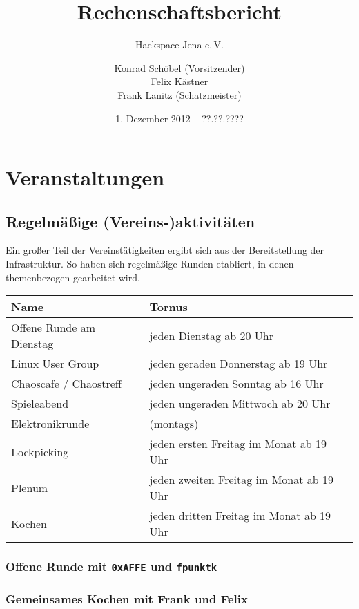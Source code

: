 \documentclass[10pt,DIV16]{scrartcl}
\title{Rechenschaftsbericht}
\subtitle{Hackspace Jena e.\,V.}
\author{%
	Konrad Schöbel (Vorsitzender)\\
	Felix Kästner\\
	Frank Lanitz (Schatzmeister)
}
\date{1. Dezember 2012 -- ??.??.????}
\begin{document}
\maketitle{}

\tableofcontents{}

\newpage{}

\section{Veranstaltungen}

\subsection{Regelmäßige (Vereins-)aktivitäten}

Ein großer Teil der Vereinstätigkeiten ergibt sich aus der
Bereitstellung der Infrastruktur. So haben sich regelmäßige Runden
etabliert, in denen themenbezogen gearbeitet wird.

\begin{table}[h]
	\begin{tabular}{l|l}
		Name   &  Tornus \\ \hline
		Offene Runde am Dienstag   &  jeden Dienstag ab 20 Uhr\\
		Linux User Group   &  jeden geraden Donnerstag ab 19 Uhr\\
		Chaoscafe / Chaostreff   &  jeden ungeraden Sonntag ab 16 Uhr\\
		Spieleabend   &  jeden ungeraden Mittwoch ab 20 Uhr\\
		Elektronikrunde   &  (montags)\\
		Lockpicking   &  jeden ersten Freitag im Monat ab 19 Uhr\\
		Plenum   &  jeden zweiten Freitag im Monat ab 19 Uhr\\
		Kochen   &  jeden dritten Freitag im Monat ab 19 Uhr\\
\end{tabular}
\end{table}

\subsubsection{Offene Runde mit \texttt{0xAFFE} und \texttt{fpunktk}}

\subsubsection{Gemeinsames Kochen mit Frank und Felix}
\end{document}
